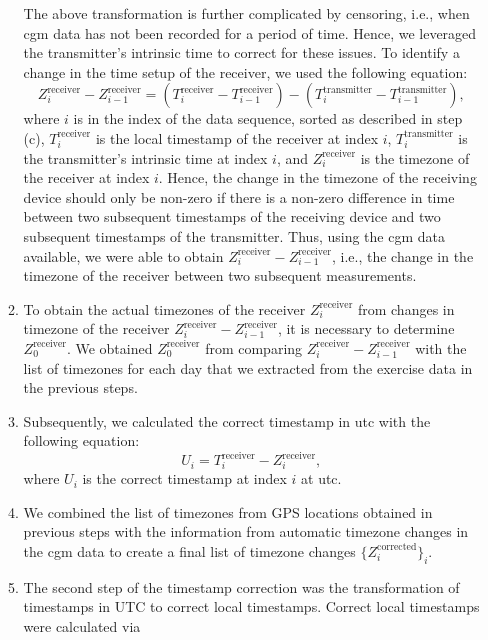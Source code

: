 \documentclass[11pt,a4paper]{article}
\begin{document}
\begin{enumerate}[label=\textbf{\arabic*}.]
\begin{enumerate}
    The above transformation is further complicated by censoring, i.e., when \gls{cgm} data has not been recorded for a period of time. Hence, we leveraged the transmitter's intrinsic time to correct for these issues. To identify a change in the time setup of the receiver, we used the following equation:
    \begin{equation}
        Z^{\text{receiver}}_{i} - Z^{\text{receiver}}_{i-1} = \left(T^{\text{receiver}}_{i} - T^{\text{receiver}}_{i-1}\right) - \left(T^{\text{transmitter}}_{i} - T^{\text{transmitter}}_{i-1}\right),
    \end{equation}
    where $i$ is in the index of the data sequence, sorted as described in step (c), $T^{\text{receiver}}_{i}$ is the local timestamp of the receiver at index $i$, $T^{\text{transmitter}}_{i}$ is the transmitter's intrinsic time at index $i$, and $Z^{\text{receiver}}_{i}$ is the timezone of the receiver at index $i$. Hence, the change in the timezone of the receiving device should only be non-zero if there is a non-zero difference in time between two subsequent timestamps of the receiving device and two subsequent timestamps of the transmitter. Thus, using the \gls{cgm} data available, we were able to obtain $Z^{\text{receiver}}_{i} - Z^{\text{receiver}}_{i-1}$, i.e., the change in the timezone of the receiver between two subsequent measurements.
    \item To obtain the actual timezones of the receiver $Z^{\text{receiver}}_{i}$ from changes in timezone of the receiver $Z^{\text{receiver}}_{i} - Z^{\text{receiver}}_{i-1}$, it is necessary to determine $Z^{\text{receiver}}_{0}$. We obtained $Z^{\text{receiver}}_{0}$ from comparing $Z^{\text{receiver}}_{i} - Z^{\text{receiver}}_{i-1}$ with the list of timezones for each day that we extracted from the exercise data in the previous steps.
    \item Subsequently, we calculated the correct timestamp in \gls{utc} with the following equation:
    \begin{equation}
        U_i = T^{\text{receiver}}_i - Z^{\text{receiver}}_i,
    \end{equation}
    where $U_i$ is the correct timestamp at index $i$ at \gls{utc}.
    \item We combined the list of timezones from GPS locations obtained in previous steps with the information from automatic timezone changes in the \gls{cgm} data to create a final list of timezone changes $\{ Z^{\text{corrected}}_i \}_i$.
    \item The second step of the timestamp correction was the transformation of timestamps in UTC to correct local timestamps. Correct local timestamps were calculated via

\end{enumerate}
\end{enumerate}
\end{document}
